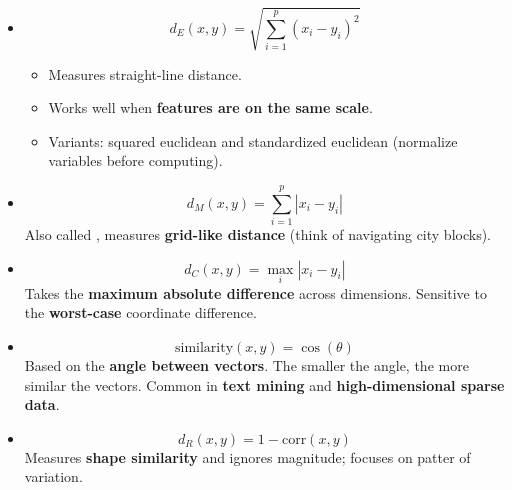 \begin{itemize}
    \item {}
    \begin{equation}
        d_{E}\left(x,y\right) = \sqrt{\displaystyle\sum_{i=1}^{p} \left(x_{i} - y_{i}\right)^{2}}
    \end{equation}
    \begin{itemize}
        \item Measures straight-line distance.
        \item Works well when \textbf{features are on the same scale}.
        \item Variants: squared euclidean and standardized euclidean (normalize variables before computing).
    \end{itemize}


    \item {}
    \begin{equation}
        d_{M}\left(x, y\right) = \displaystyle\sum_{i=1}^{p} \left|x_{i} - y_{i}\right|
    \end{equation}
    Also called , measures \textbf{grid-like distance} (think of navigating city blocks).


    \item {}
    \begin{equation}
        d_{C}\left(x, y\right) = \max_{i} \left|x_{i} - y_{i}\right|
    \end{equation}
    Takes the \textbf{maximum absolute difference} across dimensions. Sensitive to the \textbf{worst-case} coordinate difference.


    \item {}
    \begin{equation}
        \text{similarity} \left(x,y\right) = \cos\left(\theta\right)
    \end{equation}
    Based on the \textbf{angle between vectors}. The smaller the angle, the more similar the vectors. Common in \textbf{text mining} and \textbf{high-dimensional sparse data}.


    \item {}
    \begin{equation}
        d_{R}\left(x,y\right) = 1 - \text{corr}\left(x,y\right)
    \end{equation}
    Measures \textbf{shape similarity} and ignores magnitude; focuses on patter of variation.



\end{itemize}
